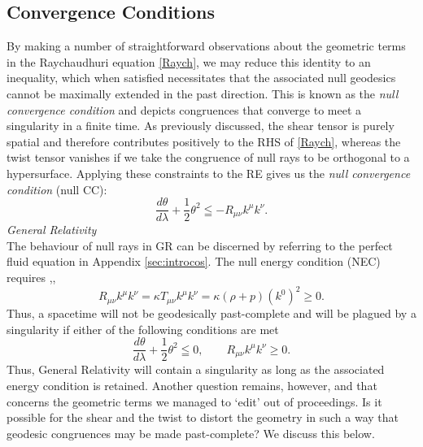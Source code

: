 \subsection{Convergence Conditions}
\label{sec:CC}
By making a number of straightforward observations about the geometric terms in the Raychaudhuri equation \eqref{Raych}, we may reduce this identity to an inequality, which when satisfied necessitates that the associated null geodesics cannot be maximally extended in the past direction. This is known as the \emph{null convergence condition} and depicts congruences that converge to meet a singularity in a finite time. As previously discussed, the shear tensor is purely spatial and therefore contributes positively to the RHS of \eqref{Raych}, whereas the twist tensor vanishes if we take the congruence of null rays to be orthogonal to a hypersurface. Applying these constraints to the RE gives us the \emph{null convergence condition} (null CC):
\[
\label{nullCC0}
\frac{d\theta}{d\lambda}+\frac{1}{2}\theta^2\leqq - R_{\mu\nu}k^\mu k^\nu
.\]
\emph{General Relativity}\\
The behaviour of null rays in GR can be discerned by referring to the perfect fluid equation in Appendix \ref{sec:introcos}. The null energy condition (NEC) requires \cite{Kar:2006ms},\cite{Vachaspati:1998dy},\cite{Borde:1996pt}
\[
R_{\mu\nu}k^\mu k^\nu=\kappa T_{\mu\nu}k^\mu k^\nu=\kappa (\rho+p)(k^0)^2\geq 0
.\]
Thus, a spacetime will not be geodesically past-complete and will be plagued by a singularity if either of the following conditions are met
\[
\label{nullCC}
\frac{d\theta}{d\lambda}+\frac{1}{2}\theta^2\leqq 0,\qquad R_{\mu\nu}k^\mu k^\nu\geq 0.
\]
Thus, General Relativity will contain a singularity as long as the associated energy condition is retained. Another question remains, however, and that concerns the geometric terms we managed to `edit' out of proceedings. Is it possible for the shear and the twist to distort the geometry in such a way that geodesic congruences may be made past-complete? We discuss this below.
